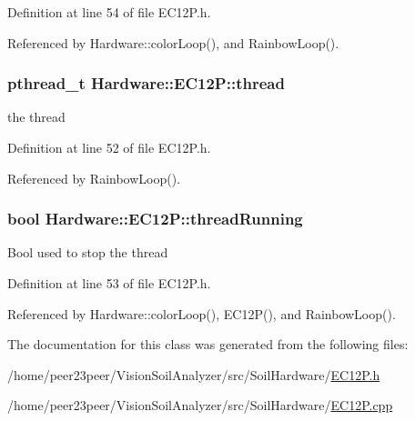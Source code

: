 Definition at line 54 of file E\+C12\+P.\+h.



Referenced by Hardware\+::color\+Loop(), and Rainbow\+Loop().

\hypertarget{class_hardware_1_1_e_c12_p_a718a90836ff46cd71d18ce099a656533}{}
\subsubsection[{thread}]{\setlength{\rightskip}{0pt plus 5cm}pthread\+\_\+t Hardware\+::\+E\+C12\+P\+::thread\hspace{0.3cm}{\ttfamily [private]}}\label{class_hardware_1_1_e_c12_p_a718a90836ff46cd71d18ce099a656533}
the thread 

Definition at line 52 of file E\+C12\+P.\+h.



Referenced by Rainbow\+Loop().

\hypertarget{class_hardware_1_1_e_c12_p_a81af8167f5a5192d8575ebad04952d57}{}
\subsubsection[{thread\+Running}]{\setlength{\rightskip}{0pt plus 5cm}bool Hardware\+::\+E\+C12\+P\+::thread\+Running\hspace{0.3cm}{\ttfamily [private]}}\label{class_hardware_1_1_e_c12_p_a81af8167f5a5192d8575ebad04952d57}
Bool used to stop the thread 

Definition at line 53 of file E\+C12\+P.\+h.



Referenced by Hardware\+::color\+Loop(), E\+C12\+P(), and Rainbow\+Loop().



The documentation for this class was generated from the following files\+:\begin{DoxyCompactItemize}
\item 
/home/peer23peer/\+Vision\+Soil\+Analyzer/src/\+Soil\+Hardware/\hyperlink{_e_c12_p_8h}{E\+C12\+P.\+h}\item 
/home/peer23peer/\+Vision\+Soil\+Analyzer/src/\+Soil\+Hardware/\hyperlink{_e_c12_p_8cpp}{E\+C12\+P.\+cpp}\end{DoxyCompactItemize}
